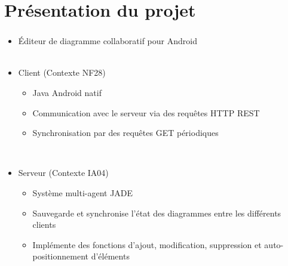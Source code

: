 \documentclass[11pt]{beamer}
\author{Jean Vintache\\Florian Impellettieri\\Charles Menier\\Marouane Hammi\\Adrien Jacquet}
\date{\today}
\begin{document}
\title{
		\hspace*{-.55cm}
}

\small
\begin{frame}
	\vspace{-0.75cm}
	\titlepage
\end{frame}


\section{Présentation du projet}
\begin{frame}
	\frametitle{\currentname}
	\begin{itemize}
		\item Éditeur de diagramme collaboratif pour Android
		\\~\\
		\item Client (Contexte NF28)
		\begin{itemize}
		  \item Java Android natif
			\item Communication avec le serveur via des requêtes HTTP REST
			\item Synchronisation par des requêtes GET périodiques
		\end{itemize}
		~\\
		\item Serveur (Contexte IA04)
		\begin{itemize}
			\item Système multi-agent JADE
			\item Sauvegarde et synchronise l'état des diagrammes entre les différents clients
			\item Implémente des fonctions d'ajout, modification, suppression et auto-positionnement d'éléments
		\end{itemize}
	\end{itemize}
\end{frame}
\end{document}
